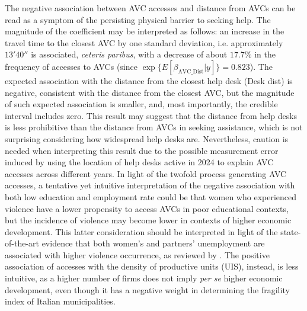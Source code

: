 \documentclass[openany, 11pt, oneside]{book}
\begin{document}
The negative association between AVC accesses and distance from AVCs can be read as a symptom of the persisting physical barrier to seeking help. The magnitude of the coefficient may be interpreted as follows: an increase in the travel time to the closest AVC by one standard deviation, i.e. approximately $13'40''$ is associated, \textit{ceteris paribus}, with a decrease of about $17.7\%$ in the frequency of accesses to AVCs (since $\exp\lbrace E\left[\beta_\mathrm{AVC\_Dist}| y \right]\rbrace = 0.823$). The expected association with the distance from the closest help desk (Desk dist) is negative, consistent with the distance from the closest AVC, but the magnitude of such expected association is smaller, and, most importantly, the credible interval includes zero. This result may suggest that the distance from help desks is less prohibitive than the distance from AVCs in seeking assistance, which is not surprising considering how widespread help desks are. Nevertheless, caution is needed when interpreting this result due to the possible measurement error induced by using the location of help desks active in 2024 to explain AVC accesses across different years. 
% 
In light of the twofold process generating AVC accesses, a tentative yet intuitive interpretation of the negative association with both low education and employment rate could be that women who experienced violence have a lower propensity to access AVCs in poor educational contexts, but the incidence of violence may become lower in contexts of higher economic development. This latter consideration should be interpreted in light of the state-of-the-art evidence that both women's and partners' unemployment are associated with higher violence occurrence, as reviewed by \parencite[][Chapter 2]{bettio2017violence}.
The positive association of accesses with the density of productive units (UIS), instead, is less intuitive, as a higher number of firms does not imply \textit{per se} higher economic development, even though it has a negative weight in determining the fragility index of Italian municipalities.
\end{document}
